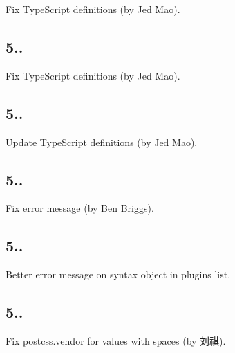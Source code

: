 \begin{DoxyItemize}
\item Fix Type\+Script definitions (by Jed Mao).
\end{DoxyItemize}

\subsection*{5..}


\begin{DoxyItemize}
\item Fix Type\+Script definitions (by Jed Mao).
\end{DoxyItemize}

\subsection*{5..}


\begin{DoxyItemize}
\item Update Type\+Script definitions (by Jed Mao).
\end{DoxyItemize}

\subsection*{5..}


\begin{DoxyItemize}
\item Fix error message (by Ben Briggs).
\end{DoxyItemize}

\subsection*{5..}


\begin{DoxyItemize}
\item Better error message on syntax object in plugins list.
\end{DoxyItemize}

\subsection*{5..}


\begin{DoxyItemize}
\item Fix {\ttfamily postcss.\+vendor} for values with spaces (by 刘祺).
\end{DoxyItemize}

